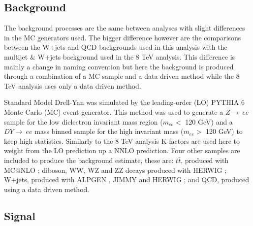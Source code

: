 \subsection*{Background}

	The background processes are the same between analyses with slight differences in the MC generators used. The bigger difference however are the comparisons between the W+jets and QCD backgrounds used in this analysis with the multijet \& W+jets background used in the 8 TeV analysis. This difference is mainly a change in naming convention but here the background is produced through a combination of a MC sample and a data driven method while the 8 TeV analysis uses only a data driven method. 

	Standard Model Drell-Yan was simulated by the leading-order (LO) PYTHIA 6 \cite{1126-6708-2006-05-026} Monte Carlo (MC) event generator. This method was used to generate a $Z\rightarrow~ee$ sample for the low dielectron invariant mass region ($m_{ee} <$ 120 GeV) and a $DY\rightarrow~ee$ mass binned sample for the high invariant mass ($m_{ee} >$ 120 GeV) to keep high statistics. Similarly to the 8 TeV analysis K-factors are used here to weight from the LO prediction up a NNLO prediction. Four other samples are included to produce the background estimate, these are: $t\bar{t}$, produced with MC@NLO \cite{Frixione:2008ym}; diboson, WW, WZ and ZZ decays produced with HERWIG \cite{Corcella:2002jc}; W+jets, produced with ALPGEN \cite{Mangano:2002ea}, JIMMY \cite{Butterworth:1996zw} and HERWIG \cite{Corcella:2002jc}; and QCD, produced using a data driven method.

\subsection*{Signal} 

